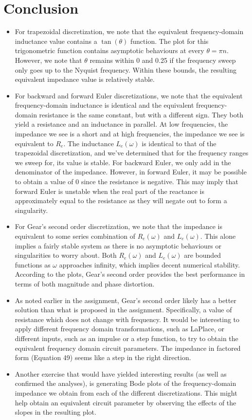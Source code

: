 \documentclass[10pt, oneside, letterpaper]{article}
\begin{document}
\section{Conclusion}
\begin{itemize}
    \item For trapezoidal discretization, we note that the equivalent frequency-domain inductance value contains a $\tan(\theta)$ function. The plot for this trigonometric function contains asymptotic behaviours at every $\theta = \pi n$. However, we note that $\theta$ remains within 0 and 0.25 if the frequency sweep only goes up to the Nyquist frequency. Within these bounds, the resulting equivalent impedance value is relatively stable.
    \item For backward and forward Euler discretizations, we note that the equivalent frequency-domain inductance is identical and the equivalent frequency-domain resistance is the same constant, but with a different sign. They both yield a resistance and an inductance in parallel. At low frequencies, the impedance we see is a short and at high frequencies, the impedance we see is equivalent to $R_e$. The inductance $L_e(\omega)$ is identical to that of the trapezoidal discretization, and we've determined that for the frequency ranges we sweep for, its value is stable. For backward Euler, we only add in the denominator of the impedance. However, in forward Euler, it may be possible to obtain a value of 0 since the resistance is negative. This may imply that forward Euler is unstable when the real part of the reactance is approximately equal to the resistance as they will negate out to form a singularity.
    \item For Gear's second order discretization, we note that the impedance is equivalent to some series combination of $R_e(\omega{})$ and $L_e(\omega{})$. This alone implies a fairly stable system as there is no asymptotic behaviours or singularities to worry about. Both $R_e(\omega{})$ and $L_e(\omega{})$ are bounded functions as $\omega$ approaches infinity, which implies decent numerical stability. According to the plots, Gear's second order provides the best performance in terms of both magnitude and phase distortion.
    \item As noted earlier in the assignment, Gear's second order likely has a better solution than what is proposed in the assignment. Specifically, a value of resistance which does not change with frequency. It would be interesting to apply different frequency domain transformations, such as LaPlace, or different inputs, such as an impulse or a step function, to try to obtain the equivalent frequency domain circuit parameters. The impedance in factored form (Equation 49) seems like a step in the right direction.
    \item Another exercise that would have yielded interesting results (as well as confirmed the analyses), is generating Bode plots of the frequency-domain impedance we obtain from each of the different discretizations. This might help obtain an equivalent circuit parameter by observing the effects of the slopes in the resulting plot.
\end{itemize}
\end{document}

